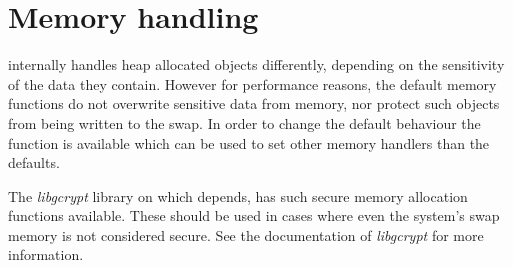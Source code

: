 \section{Memory handling}

\gnutls{} internally handles heap allocated objects differently, depending
on the sensitivity of the data they contain. However for performance
reasons, the default memory functions do not overwrite sensitive data from
memory, nor protect such objects from being written to the swap. 
In order to change the default behaviour the
\\
function is available which can be used to set other memory 
handlers than the defaults. 
\par
The \emph{libgcrypt} library on which \gnutls{} depends, has such secure
memory allocation functions available. These should be used in cases
where even the system's swap memory is not considered secure. See
the documentation of \emph{libgcrypt} for more information.

